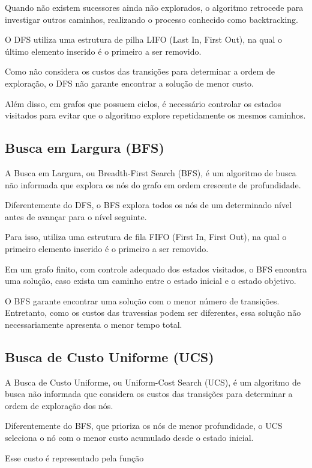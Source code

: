 \documentclass{article}
\begin{document}
Quando não existem sucessores ainda não explorados,
o algoritmo retrocede para investigar outros caminhos,
realizando o processo conhecido como backtracking.

O DFS utiliza uma estrutura de pilha LIFO
(Last In, First Out), na qual o último elemento
inserido é o primeiro a ser removido.

Como não considera os custos das transições para
determinar a ordem de exploração, o DFS não garante
encontrar a solução de menor custo.

Além disso, em grafos que possuem ciclos, é necessário
controlar os estados visitados para evitar que o
algoritmo explore repetidamente os mesmos caminhos.

\subsection{Busca em Largura (BFS)}

A Busca em Largura, ou Breadth-First Search (BFS),
é um algoritmo de busca não informada que explora
os nós do grafo em ordem crescente de profundidade.

Diferentemente do DFS, o BFS explora todos os nós
de um determinado nível antes de avançar para
o nível seguinte.

Para isso, utiliza uma estrutura de fila FIFO
(First In, First Out), na qual o primeiro elemento
inserido é o primeiro a ser removido.

Em um grafo finito, com controle adequado dos
estados visitados, o BFS encontra uma solução,
caso exista um caminho entre o estado inicial
e o estado objetivo.

O BFS garante encontrar uma solução com o menor
número de transições. Entretanto, como os custos
das travessias podem ser diferentes, essa solução
não necessariamente apresenta o menor tempo total.

\subsection{Busca de Custo Uniforme (UCS)}

A Busca de Custo Uniforme, ou Uniform-Cost Search
(UCS), é um algoritmo de busca não informada que
considera os custos das transições para determinar
a ordem de exploração dos nós.

Diferentemente do BFS, que prioriza os nós de menor
profundidade, o UCS seleciona o nó com o menor
custo acumulado desde o estado inicial.

Esse custo é representado pela função
\end{document}
